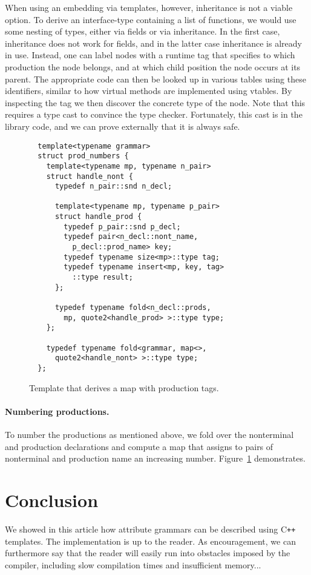 \documentclass{llncs}
\newcommand*{\Cpp}{C\texttt{++}}
\begin{document}
  When using an embedding via templates, however,
  inheritance is not a viable option. To derive an interface-type containing
  a list of functions, we would use some nesting of
  types, either via fields or via inheritance. In the
  first case, inheritance does not work for fields,
  and in the latter case inheritance is already in use.
  Instead, one can label nodes with a runtime tag that
  specifies to which production the node belongs, and
  at which child position the node occurs at its parent.
  The appropriate code can then be looked up in various
  tables using these identifiers, similar to how
  virtual methods are implemented using vtables.
  By inspecting the tag we then discover the concrete type
  of the node. Note that this requires a type cast to
  convince the type checker. Fortunately, this cast is
  in the library code, and we can prove externally that
  it is always safe.

  \begin{figure}[tb]
  \begin{lstlisting}
  template<typename grammar>
  struct prod_numbers {
    template<typename mp, typename n_pair>
    struct handle_nont {
      typedef n_pair::snd n_decl;

      template<typename mp, typename p_pair>
      struct handle_prod {
        typedef p_pair::snd p_decl;
        typedef pair<n_decl::nont_name,
          p_decl::prod_name> key;
        typedef typename size<mp>::type tag;
        typedef typename insert<mp, key, tag>
          ::type result;
      };

      typedef typename fold<n_decl::prods,
        mp, quote2<handle_prod> >::type type;
    };

    typedef typename fold<grammar, map<>,
      quote2<handle_nont> >::type type;
  }; 
  \end{lstlisting}
  \caption{Template that derives a map with production tags.}
  \label{fig:numbering}
  \end{figure}

  \paragraph{Numbering productions.}
  To number the productions as mentioned above, we fold over
  the nonterminal and production declarations and compute
  a map that assigns to pairs of nonterminal and production
  name an increasing number. Figure~\ref{fig:numbering} demonstrates.

  \section{Conclusion}
  We showed in this article how attribute grammars can be described using \Cpp{}
  templates. The implementation is up to the reader. As encouragement, we can
  furthermore say that the reader will easily run into obstacles imposed by
  the compiler, including slow compilation times and insufficient memory...



\end{document}
